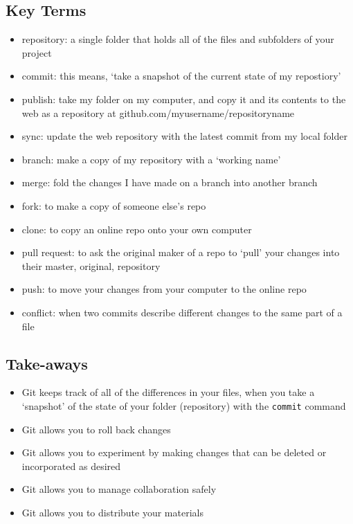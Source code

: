 \documentclass[english,]{book}
\providecommand{\tightlist}{%
  \setlength{\itemsep}{0pt}\setlength{\parskip}{0pt}}
\begin{document}
\subsection{Key Terms}\label{key-terms}

\begin{itemize}
\tightlist
\item
  repository: a single folder that holds all of the files and subfolders
  of your project
\item
  commit: this means, `take a snapshot of the current state of my
  repostiory'
\item
  publish: take my folder on my computer, and copy it and its contents
  to the web as a repository at github.com/myusername/repositoryname
\item
  sync: update the web repository with the latest commit from my local
  folder
\item
  branch: make a copy of my repository with a `working name'
\item
  merge: fold the changes I have made on a branch into another branch
\item
  fork: to make a copy of someone else's repo
\item
  clone: to copy an online repo onto your own computer
\item
  pull request: to ask the original maker of a repo to `pull' your
  changes into their master, original, repository
\item
  push: to move your changes from your computer to the online repo
\item
  conflict: when two commits describe different changes to the same part
  of a file
\end{itemize}

\subsection{Take-aways}\label{take-aways-1}

\begin{itemize}
\tightlist
\item
  Git keeps track of all of the differences in your files, when you take
  a `snapshot' of the state of your folder (repository) with the
  \texttt{commit} command
\item
  Git allows you to roll back changes
\item
  Git allows you to experiment by making changes that can be deleted or
  incorporated as desired
\item
  Git allows you to manage collaboration safely
\item
  Git allows you to distribute your materials
\end{itemize}
\end{document}
